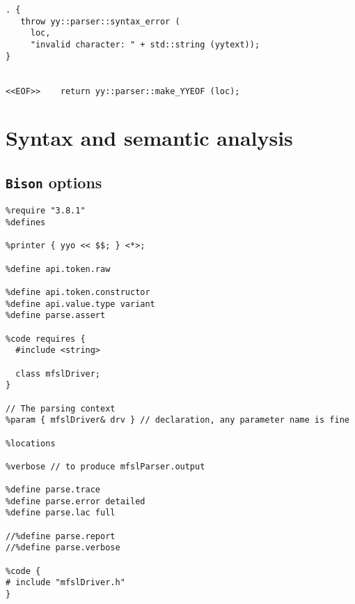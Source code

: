 \begin{lstlisting}[language=Terminal]
. {
   throw yy::parser::syntax_error (
     loc,
     "invalid character: " + std::string (yytext));
}


<<EOF>>    return yy::parser::make_YYEOF (loc);
\end{lstlisting}



\section{Syntax and semantic analysis}


\subsection{{\tt Bison} options}

\begin{lstlisting}[language=Terminal]
%skeleton "lalr1.cc" // -*- C++ -*-
%require "3.8.1"
%defines

%printer { yyo << $$; } <*>;

%define api.token.raw

%define api.token.constructor
%define api.value.type variant
%define parse.assert

%code requires {
  #include <string>

  class mfslDriver;
}

// The parsing context
%param { mfslDriver& drv } // declaration, any parameter name is fine

%locations

%verbose // to produce mfslParser.output

%define parse.trace
%define parse.error detailed
%define parse.lac full

//%define parse.report
//%define parse.verbose

%code {
# include "mfslDriver.h"
}
\end{lstlisting}

